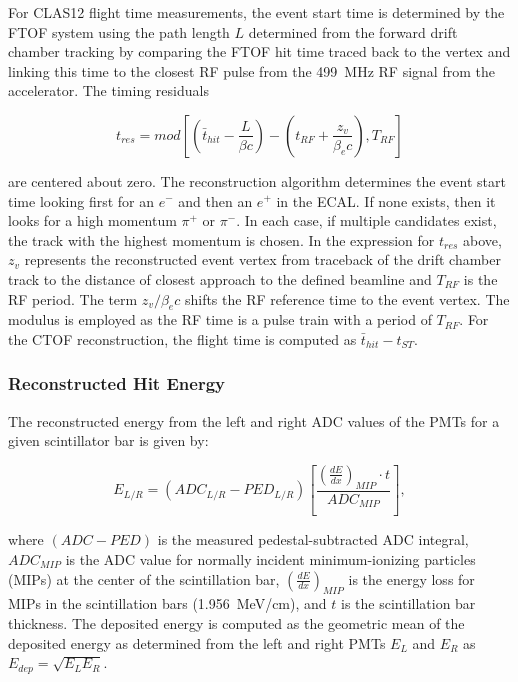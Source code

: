 \documentclass[3p,times,twocolumn]{elsarticle}
\begin{document}
For CLAS12 flight time measurements, the event start time is determined by the FTOF system using the
path length $L$ determined from the forward drift chamber tracking by comparing the FTOF hit time
traced back to the vertex and linking this time to the closest RF pulse from the 499~MHz RF signal from
the accelerator. The timing residuals

\begin{equation}
t_{res} = mod \left [ \left (\bar{t}_{hit} - \frac{L}{\beta c} \right) - \left (t_{RF} + \frac{z_v}{\beta_e c} \right),
T_{RF} \right ]
\end{equation}

\noindent
are centered about zero. The reconstruction algorithm determines the event start time looking first for an
$e^-$ and then an $e^+$ in the ECAL. If none exists, then it looks for a high momentum $\pi^+$ or $\pi^-$. In
each case, if multiple candidates exist, the track with the highest momentum is chosen. In the expression for
$t_{res}$ above, $z_v$ represents the reconstructed event vertex from traceback of the drift chamber track
to the distance of closest approach to the defined beamline and $T_{RF}$ is the RF period. The term
$z_v/\beta_e c$ shifts the RF reference time to the event vertex. The modulus is employed as the RF time is a
pulse train with a period of $T_{RF}$. For the CTOF reconstruction, the flight time is computed as
$\bar{t}_{hit} - t_{ST}$.

\subsubsection{Reconstructed Hit Energy}
\label{rec:energy}

The reconstructed energy from the left and right ADC values of the PMTs for a given scintillator bar is given by:

\begin{equation}
E_{L/R} = (ADC_{L/R} - PED_{L/R}) \left [ \frac{\left( \frac{dE}{dx} \right )_{MIP} \cdot t}{ADC_{MIP}} \right ],
\end{equation}

\noindent
where $(ADC  - PED)$ is the measured pedestal-subtracted ADC integral, $ADC_{MIP}$ is the ADC value for normally
incident minimum-ionizing particles (MIPs) at the center of the scintillation bar, $\left( \frac{dE}{dx} \right)_{MIP}$
is the energy loss for MIPs in the scintillation bars (1.956~MeV/cm), and $t$ is the scintillation bar thickness.
The deposited energy is computed as the geometric mean of the deposited energy as determined from the left and
right PMTs $E_L$ and $E_R$ as $E_{dep} = \sqrt{E_L E_R}$.
\end{document}
